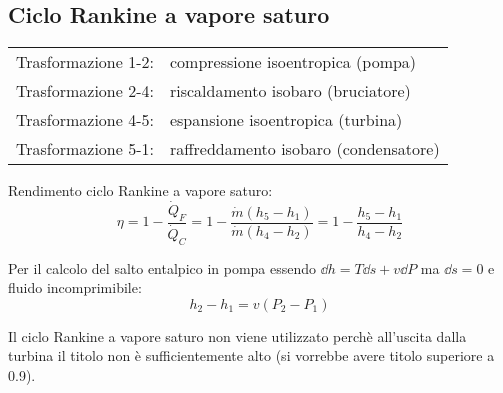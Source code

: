 \subsection{Ciclo Rankine a vapore saturo}

\begin{tabular}{p{2.5cm}l}
Trasformazione 1-2: & compressione isoentropica (pompa)\\
Trasformazione 2-4: & riscaldamento isobaro (bruciatore)\\
Trasformazione 4-5: & espansione isoentropica (turbina)\\
Trasformazione 5-1: & raffreddamento isobaro (condensatore)\\
\end{tabular}

Rendimento ciclo Rankine a vapore saturo:
\[ \eta = 1 - \frac{\dot{Q}_F}{\dot{Q}_C} = 1 - \frac{\dot{m}(h_5-h_1)}{\dot{m}(h_4-h_2)} = 1 - \frac{h_5-h_1}{h_4-h_2} \]

Per il calcolo del salto entalpico in pompa essendo $\dd{h} = T\dd{s} + v\dd{P}$ ma $\dd{s} = 0$ e fluido incomprimibile:
\[ h_2-h_1 = v(P_2-P_1) \]

Il ciclo Rankine a vapore saturo non viene utilizzato perchè all'uscita dalla turbina il titolo non è sufficientemente alto (si vorrebbe avere titolo superiore a 0.9).
